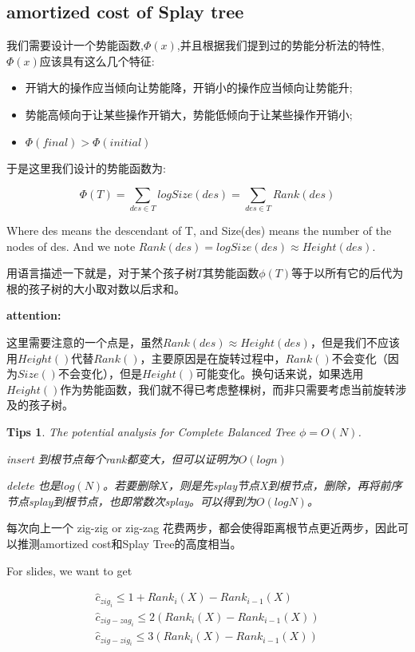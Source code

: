 \documentclass{article}
\newtheorem*{Tips}{Tips}
\begin{document}
\subsection{amortized cost of Splay tree}
我们需要设计一个势能函数,$\Phi(x)$,并且根据我们提到过的势能分析法的特性,$\Phi(x)$应该具有这么几个特征:
\begin{itemize}
    \item 开销大的操作应当倾向让势能降，开销小的操作应当倾向让势能升;
    \item 势能高倾向于让某些操作开销大，势能低倾向于让某些操作开销小;
    \item $\Phi(final) > \Phi(initial)$
\end{itemize}
\hspace*{\fill}\par
于是这里我们设计的势能函数为:\par
$$\Phi(T) = \sum_{des \in T} logSize(des) = \sum_{des \in T} Rank(des)$$\par
Where des means the descendant of T, and Size(des) means the number of the nodes of des. And we note $Rank(des)=logSize(des) \approx Height(des)$.\par
用语言描述一下就是，对于某个孩子树$T$其势能函数$\phi(T)$等于以所有它的后代为根的孩子树的大小取对数以后求和。\par
\textbf{attention:}\par
这里需要注意的一个点是，虽然$Rank(des) \approx Height(des)$，但是我们不应该用$Height()$代替$Rank()$，主要原因是在旋转过程中，$Rank()$不会变化（因为$Size()$不会变化），但是$Height()$可能变化。换句话来说，如果选用$Height()$作为势能函数，我们就不得已考虑整棵树，而非只需要考虑当前旋转涉及的孩子树。
\hspace*{\fill}\par

\begin{Tips}
    The potential analysis for Complete Balanced Tree $\phi = O(N)$.\par
    insert 到根节点每个rank都变大，但可以证明为$O(log n)$\par
    delete 也是$log(N)$。若要删除$X$，则是先splay节点X到根节点，删除，再将前序节点splay到根节点，也即常数次splay。可以得到为$O(log N)$。
\end{Tips}
\par
每次向上一个 zig-zig or zig-zag 花费两步，都会使得距离根节点更近两步，因此可以推测amortized cost和Splay Tree的高度相当。\par

For slides, we want to get\par
\begin{align*}
    \hat c_{zig_i} \leq 1 + Rank_i(X) - Rank_{i-1}(X)\\
    \hat c_{zig-zag_i} \leq 2(Rank_i(X) - Rank_{i-1}(X))\\
    \hat c_{zig-zig_i} \leq 3(Rank_i(X) - Rank_{i-1}(X))
\end{align*}
\end{document}
